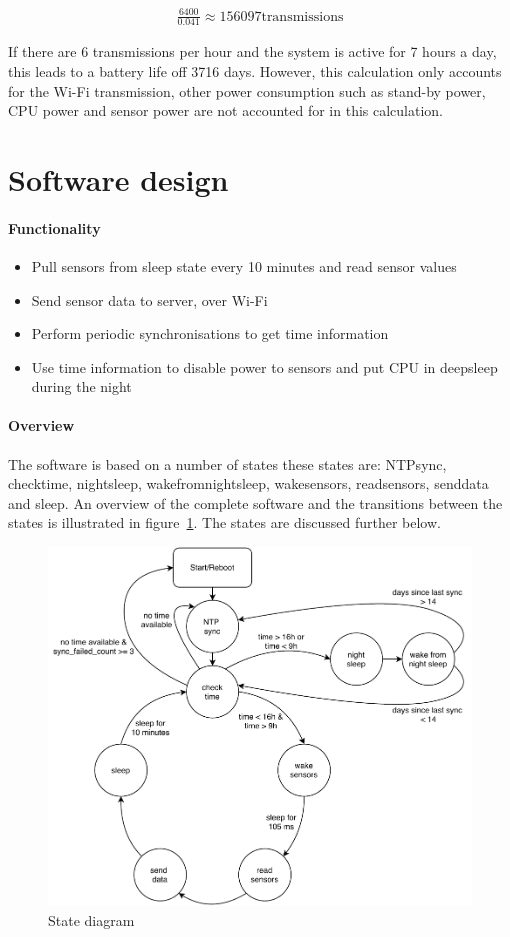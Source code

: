 \documentclass[11pt,a4paper]{article}
\begin{document}
\begin{gather*}
	\frac{6400}{0.041} \approx 156097 \text{transmissions}
\end{gather*}

If there are 6 transmissions per hour and the system is active for 7 hours a day, this leads to a battery life off 3716 days.  However, this calculation only accounts for the Wi-Fi transmission, other power consumption such as stand-by power, CPU power and sensor power are not accounted for in this calculation. 

\section{Software design}
\paragraph{Functionality}
\begin{itemize}
	\item Pull sensors from sleep state every 10 minutes and read sensor values
	\item Send sensor data to server, over Wi-Fi
	\item Perform periodic synchronisations to get time information
	\item Use time information to disable power to sensors and put CPU in deepsleep during the night
\end{itemize}
\paragraph{Overview}
The software is based on a number of states these states are: NTPsync, checktime, nightsleep, wakefromnightsleep, wakesensors, readsensors, senddata and sleep. An overview of the complete software and the transitions between the states is illustrated in figure~\ref{fig:statediagram}. The states are discussed further below. 
\begin{figure}[!ht]
	\centering
	\includegraphics[width=1\linewidth]{statendiagram.pdf}
	\caption{State diagram}
	\label{fig:statediagram}
\end{figure}
\end{document}
